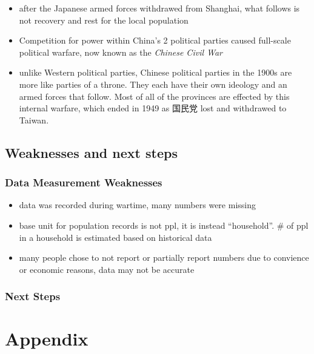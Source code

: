 \documentclass[
  letterpaper,
  DIV=11,
  numbers=noendperiod]{scrartcl}
\providecommand{\tightlist}{%
  \setlength{\itemsep}{0pt}\setlength{\parskip}{0pt}}\usepackage{longtable,booktabs,array}
\begin{document}
\begin{itemize}
\tightlist
\item
  after the Japanese armed forces withdrawed from Shanghai, what follows
  is not recovery and rest for the local population
\item
  Competition for power within China's 2 political parties caused
  full-scale political warfare, now known as the \emph{Chinese Civil
  War}
\item
  unlike Western political parties, Chinese political parties in the
  1900s are more like parties of a throne. They each have their own
  ideology and an armed forces that follow. Most of all of the provinces
  are effected by this internal warfare, which ended in 1949 as 国民党
  lost and withdrawed to Taiwan.
\end{itemize}

\hypertarget{weaknesses-and-next-steps}{%
\subsection{Weaknesses and next steps}\label{weaknesses-and-next-steps}}

\hypertarget{data-measurement-weaknesses}{%
\subsubsection{Data Measurement
Weaknesses}\label{data-measurement-weaknesses}}

\begin{itemize}
\tightlist
\item
  data was recorded during wartime, many numbers were missing
\item
  base unit for population records is not ppl, it is instead
  ``household''. \# of ppl in a household is estimated based on
  historical data
\item
  many people chose to not report or partially report numbers due to
  convience or economic reasons, data may not be accurate
\end{itemize}

\hypertarget{next-steps}{%
\subsubsection{Next Steps}\label{next-steps}}

\newpage

\appendix

\hypertarget{appendix}{%
\section*{Appendix}\label{appendix}}
\end{document}
